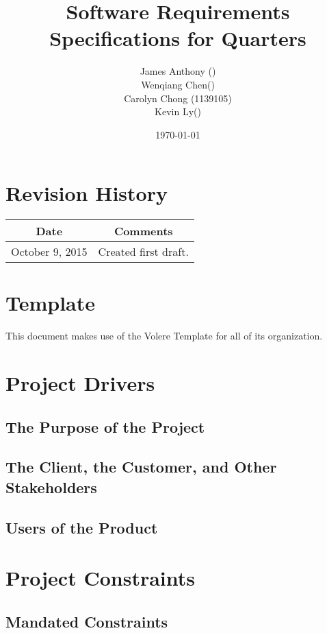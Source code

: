 \documentclass[12pt, titlepage]{article}
\begin{document}
\title{Software Requirements Specifications for Quarters} 
\author{James Anthony ()\\ Wenqiang Chen()\\ Carolyn Chong (1139105)\\ Kevin Ly()}
\date{\today}
\maketitle

\tableofcontents 
\listoffigures
\listoftables

\section*{Revision History}
\begin{tabular}{|c|c|}
\hline
\textbf{Date}  & \textbf{Comments} \\ \hline
October 9, 2015 & Created first draft. \\ 
\hline
\end{tabular}

\section*{Template}
This document makes use of the Volere Template for all of its organization.

\pagebreak

\section{Project Drivers}
\subsection{The Purpose of the Project}
\subsection{The Client, the Customer, and Other Stakeholders}
\subsection{Users of the Product}

\section{Project Constraints}
\subsection{Mandated Constraints}
\end{document}
